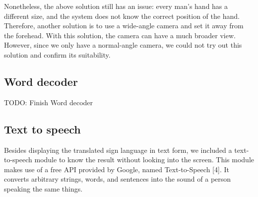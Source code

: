 Nonetheless, the above solution still has an issue: every man’s hand has a different size, and the system does not know the correct position of the hand. Therefore, another solution is to use a wide-angle camera and set it away from the forehead. With this solution, the camera can have a much broader view. However, since we only have a normal-angle camera, we could not try out this solution and confirm its suitability.

\subsection{Word decoder}

TODO: Finish Word decoder

\subsection{Text to speech}

Besides displaying the translated sign language in text form, we included a text-to-speech module to know the result without looking into the screen. This module makes use of a free API provided by Google, named Text-to-Speech [4]. It converts arbitrary strings, words, and sentences into the sound of a person speaking the same things.
